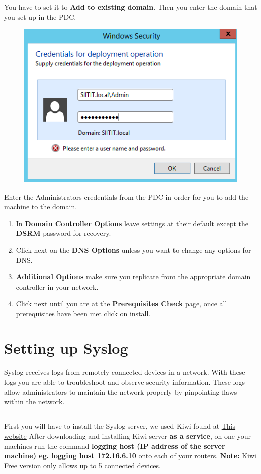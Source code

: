 \documentclass{article}
\begin{document}
You have to set it to \textbf{Add to existing domain}. Then you enter the domain that you set up in the PDC. 
\newpage
\begin{figure}[h]
	\centering
	\includegraphics[width=.4\linewidth, height=.2\textheight]{BDC/2}
\end{figure}
Enter the Administrators credentials from the PDC in order for you to add the machine to the domain.
\begin{enumerate}
	\item In \textbf{Domain Controller Options} leave settings at their default except the \textbf{DSRM} password for recovery.
	\item Click next on the \textbf{DNS Options} unless you want to change any options for DNS.
	\item \textbf{Additional Options} make sure you replicate from the appropriate domain controller in your network.
	\item Click next until you are at the \textbf{Prerequisites Check} page, once all prerequisites have been met click on install.
\end{enumerate}
\section{Setting up Syslog}
Syslog receives logs from remotely connected devices in a network. With these logs you are able to troubleshoot and observe security information. These logs allow administrators to maintain the network properly by pinpointing flaws within the network.
\subsection{}
First you will have to install the Syslog server, we used Kiwi found at \href{https://www.kiwisyslog.com/free-tools/kiwi-free-syslog-server}{This website}
After downloading and installing Kiwi server \textbf{as a service}, on one your machines run the command \textbf{logging host (IP address of the server machine) eg. logging host 172.16.6.10} onto each of your routers. \textbf{Note:} Kiwi Free version only allows up to 5 connected devices.
\newpage
\end{document}
